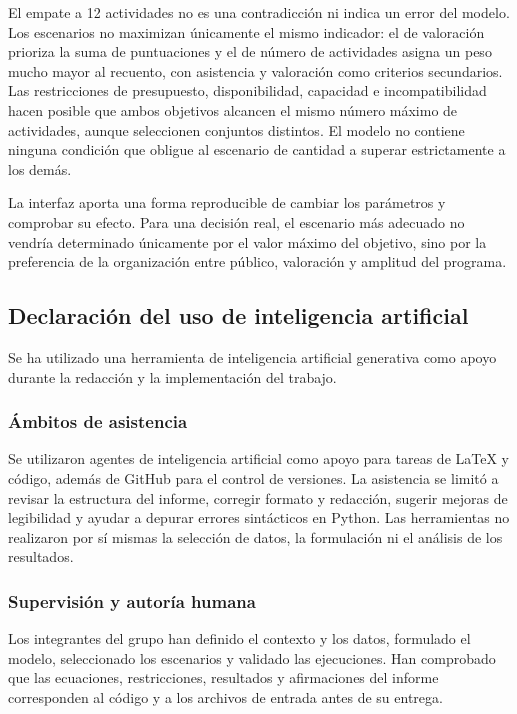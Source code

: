 El empate a 12 actividades no es una contradicción ni indica un error del
modelo. Los escenarios no maximizan únicamente el mismo indicador: el de
valoración prioriza la suma de puntuaciones y el de número de actividades
asigna un peso mucho mayor al recuento, con asistencia y valoración como
criterios secundarios. Las restricciones de presupuesto, disponibilidad,
capacidad e incompatibilidad hacen posible que ambos objetivos alcancen el
mismo número máximo de actividades, aunque seleccionen conjuntos distintos.
El modelo no contiene ninguna condición que obligue al escenario de cantidad a
superar estrictamente a los demás.

La interfaz aporta una forma reproducible de cambiar los parámetros y comprobar
su efecto. Para una decisión real, el escenario más adecuado no vendría
determinado únicamente por el valor máximo del objetivo, sino por la preferencia
de la organización entre público, valoración y amplitud del programa.

\subsection{Declaración del uso de inteligencia artificial}

Se ha utilizado una herramienta de inteligencia artificial generativa como apoyo
durante la redacción y la implementación del trabajo.

\subsubsection{Ámbitos de asistencia}
Se utilizaron agentes de inteligencia artificial como apoyo para tareas de
LaTeX y código, además de GitHub para el control de versiones. La asistencia
se limitó a revisar la estructura del informe, corregir formato y redacción,
sugerir mejoras de legibilidad y ayudar a depurar errores sintácticos en
Python. Las herramientas no realizaron por sí mismas la selección de datos, la
formulación ni el análisis de los resultados.

\subsubsection{Supervisión y autoría humana}
Los integrantes del grupo han definido el contexto y los datos, formulado el
modelo, seleccionado los escenarios y validado las ejecuciones. Han comprobado
que las ecuaciones, restricciones, resultados y afirmaciones del informe
corresponden al código y a los archivos de entrada antes de su entrega.
